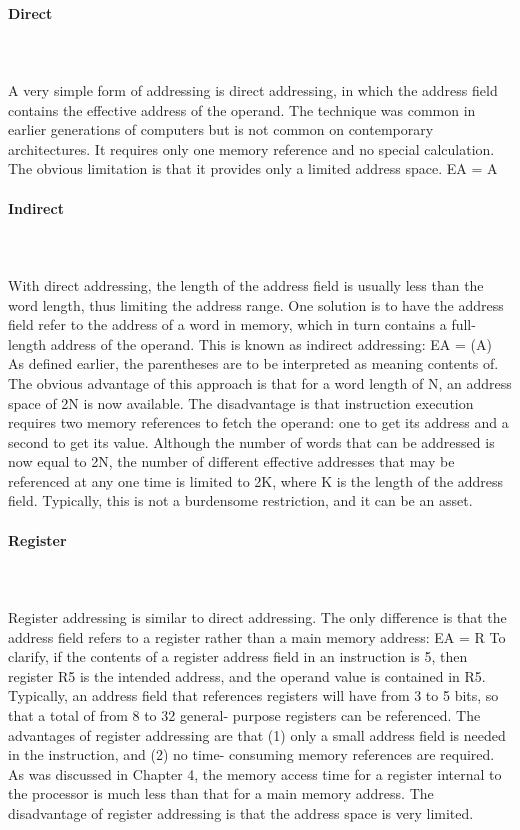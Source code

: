 \paragraph{Direct}\mbox{}\\\\%
A very simple form of addressing is direct addressing, in which the address field contains
the effective address of the operand.
The technique was common in earlier generations of computers but is not common
on contemporary architectures. It requires only one memory reference and no
special calculation. The obvious limitation is that it provides only a limited address
space.
EA = A
\paragraph{Indirect}\mbox{}\\\\%
With direct addressing, the length of the address field is usually less than the word
length, thus limiting the address range. One solution is to have the address field refer
to the address of a word in memory, which in turn contains a full-
length address of the operand. This is known as indirect addressing:
EA = (A)
As defined earlier, the parentheses are to be interpreted as meaning contents
of. The obvious advantage of this approach is that for a word length of N, an address
space of 2N is now available. The disadvantage is that instruction execution requires
two memory references to fetch the operand: one to get its address and a second to
get its value. Although the number of words that can be addressed is now equal to 2N, the
number of different effective addresses that may be referenced at any one time is
limited to 2K, where K is the length of the address field. Typically, this is not a burdensome
restriction, and it can be an asset.
\paragraph{Register}\mbox{}\\\\%
Register addressing is similar to direct addressing. The only difference is that the
address field refers to a register rather than a main memory address:
EA = R
To clarify, if the contents of a register address field in an instruction is 5, then
register R5 is the intended address, and the operand value is contained in R5. Typically,
an address field that references registers will have from 3 to 5 bits, so that a
total of from 8 to 32 general-
purpose
registers can be referenced.
The advantages of register addressing are that (1) only a small address field
is needed in the instruction, and (2) no time-
consuming
memory references are
required. As was discussed in Chapter 4, the memory access time for a register
internal to the processor is much less than that for a main memory address. The disadvantage
of register addressing is that the address space is very limited.
